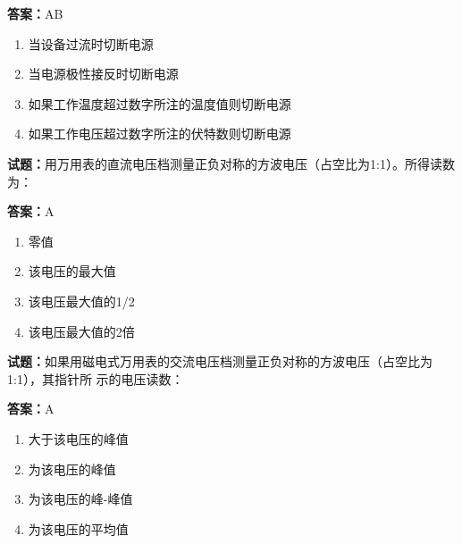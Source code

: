 \documentclass{ctexbook}
\begin{document}
\textbf{答案：}AB 

\begin{enumerate}[leftmargin=3em]
  \item 当设备过流时切断电源 

  \item 当电源极性接反时切断电源 

  \item 如果工作温度超过数字所注的温度值则切断电源 

  \item 如果工作电压超过数字所注的伏特数则切断电源 

\end{enumerate}





\vspace{1em}

\textbf{试题：}用万用表的直流电压档测量正负对称的方波电压（占空比为1:1）。所得读数为： 

\textbf{答案：}A 

\begin{enumerate}[leftmargin=3em]
  \item 零值 

  \item 该电压的最大值 

  \item 该电压最大值的1/2 

  \item 该电压最大值的2倍 

\end{enumerate}






\vspace{1em}

\textbf{试题：}如果用磁电式万用表的交流电压档测量正负对称的方波电压（占空比为1:1），其指针所
示的电压读数： 

\textbf{答案：}A 

\begin{enumerate}[leftmargin=3em]
  \item 大于该电压的峰值 

  \item 为该电压的峰值 

  \item 为该电压的峰-峰值 

  \item 为该电压的平均值 

\end{enumerate}
\end{document}
